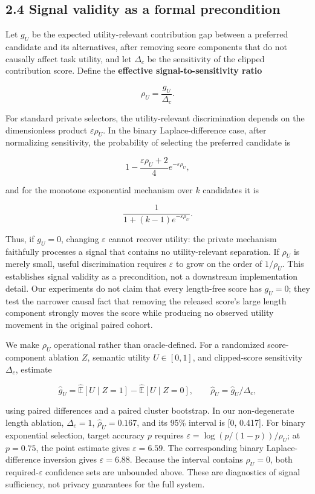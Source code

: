 \documentclass{article}
\begin{document}
\subsection{2.4 Signal validity as a formal precondition}

Let \(g_U\) be the expected utility-relevant contribution gap between a preferred candidate and its alternatives, after removing score components that do not causally affect task utility, and let \(\Delta_c\) be the sensitivity of the clipped contribution score. Define the \textbf{effective signal-to-sensitivity ratio}

\[
\rho_U = \frac{g_U}{\Delta_c}.
\]

For standard private selectors, the utility-relevant discrimination depends on the dimensionless product \(\varepsilon\rho_U\). In the binary Laplace-difference case, after normalizing sensitivity, the probability of selecting the preferred candidate is

\[
1-\frac{\varepsilon\rho_U+2}{4}e^{-\varepsilon\rho_U},
\]

and for the monotone exponential mechanism over \(k\) candidates it is

\[
\frac{1}{1+(k-1)e^{-\varepsilon\rho_U}}.
\]

Thus, if \(g_U=0\), changing \(\varepsilon\) cannot recover utility: the private mechanism faithfully processes a signal that contains no utility-relevant separation. If \(\rho_U\) is merely small, useful discrimination requires \(\varepsilon\) to grow on the order of \(1/\rho_U\). This establishes signal validity as a precondition, not a downstream implementation detail. Our experiments do not claim that every length-free score has \(g_U=0\); they test the narrower causal fact that removing the released score's large length component strongly moves the score while producing no observed utility movement in the original paired cohort.

We make \(\rho_U\) operational rather than oracle-defined. For a randomized score-component ablation \(Z\), semantic utility \(U\in[0,1]\), and clipped-score sensitivity \(\Delta_c\), estimate

\[
\widehat g_U = \widehat{\mathbb E}[U\mid Z=1]-\widehat{\mathbb E}[U\mid Z=0],
\qquad
\widehat\rho_U=\widehat g_U/\Delta_c,
\]

using paired differences and a paired cluster bootstrap. In our non-degenerate length ablation, \(\Delta_c=1\), \(\widehat\rho_U=0.167\), and its 95\% interval is [0, 0.417]. For binary exponential selection, target accuracy \(p\) requires \(\varepsilon=\log(p/(1-p))/\rho_U\); at \(p=0.75\), the point estimate gives \(\varepsilon=6.59\). The corresponding binary Laplace-difference inversion gives \(\varepsilon=6.88\). Because the interval contains \(\rho_U=0\), both required-\(\varepsilon\) confidence sets are unbounded above. These are diagnostics of signal sufficiency, not privacy guarantees for the full system.
\end{document}
